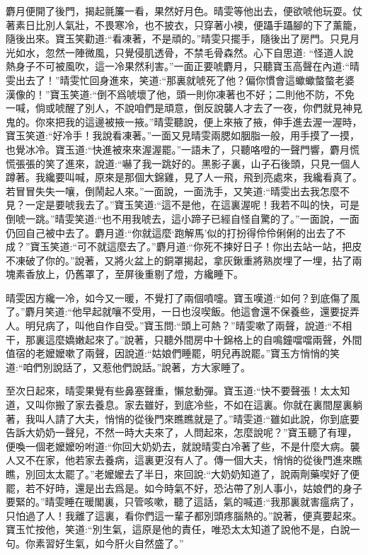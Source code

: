 \begin{parag}
    麝月便開了後門，揭起氈簾一看，果然好月色。晴雯等他出去，便欲唬他玩耍。仗著素日比別人氣壯，不畏寒冷，也不披衣，只穿著小襖，便躡手躡腳的下了薰籠，隨後出來。寶玉笑勸道:“看凍著，不是頑的。”晴雯只擺手，隨後出了房門。只見月光如水，忽然一陣微風，只覺侵肌透骨，不禁毛骨森然。心下自思道: “怪道人說熱身子不可被風吹，這一冷果然利害。”一面正要唬麝月，只聽寶玉高聲在內道:“晴雯出去了！”晴雯忙回身進來，笑道:“那裏就唬死了他？偏你慣會這蠍蠍螫螫老婆漢像的！”寶玉笑道:“倒不爲唬壞了他，頭一則你凍著也不好；二則他不防，不免一喊，倘或唬醒了別人，不說咱們是頑意，倒反說襲人才去了一夜，你們就見神見鬼的。你來把我的這邊被掖一掖。”晴雯聽說，便上來掖了掖，伸手進去渥一渥時，寶玉笑道:“好冷手！我說看凍著。”一面又見晴雯兩腮如胭脂一般，用手摸了一摸，也覺冰冷。寶玉道:“快進被來來渥渥罷。”一語未了，只聽咯噔的一聲門響，麝月慌慌張張的笑了進來，說道:“嚇了我一跳好的。黑影子裏，山子石後頭，只見一個人蹲著。我纔要叫喊，原來是那個大錦雞，見了人一飛，飛到亮處來，我纔看真了。若冒冒失失一嚷，倒鬧起人來。”一面說，一面洗手，又笑道:“晴雯出去我怎麼不見？一定是要唬我去了。”寶玉笑道:“這不是他，在這裏渥呢！我若不叫的快，可是倒唬一跳。”晴雯笑道:“也不用我唬去，這小蹄子已經自怪自驚的了。”一面說，一面仍回自己被中去了。麝月道:“你就這麼‘跑解馬’似的打扮得伶伶俐俐的出去了不成？”寶玉笑道:“可不就這麼去了。”麝月道:“你死不揀好日子！你出去站一站，把皮不凍破了你的。”說著，又將火盆上的銅罩揭起，拿灰鍬重將熟炭埋了一埋，拈了兩塊素香放上，仍舊罩了，至屏後重剔了燈，方纔睡下。
\end{parag}


\begin{parag}
    晴雯因方纔一冷，如今又一暖，不覺打了兩個噴嚏。寶玉嘆道:“如何？到底傷了風了。”麝月笑道:“他早起就嚷不受用，一日也沒喫飯。他這會還不保養些，還要捉弄人。明兒病了，叫他自作自受。”寶玉問:“頭上可熱？”晴雯嗽了兩聲，說道:“不相干，那裏這麼嬌嫩起來了。”說著，只聽外間房中十錦格上的自鳴鐘噹噹兩聲，外間值宿的老嬤嬤嗽了兩聲，因說道:“姑娘們睡罷，明兒再說罷。”寶玉方悄悄的笑道:“咱們別說話了，又惹他們說話。”說著，方大家睡了。
\end{parag}


\begin{parag}
    至次日起來，晴雯果覺有些鼻塞聲重，懶怠動彈。寶玉道:“快不要聲張！太太知道，又叫你搬了家去養息。家去雖好，到底冷些，不如在這裏。你就在裏間屋裏躺著，我叫人請了大夫，悄悄的從後門來瞧瞧就是了。”晴雯道:“雖如此說，你到底要告訴大奶奶一聲兒，不然一時大夫來了，人問起來，怎麼說呢？”寶玉聽了有理，便喚一個老嬤嬤吩咐道:“你回大奶奶去，就說晴雯白冷著了些，不是什麼大病。襲人又不在家，他若家去養病，這裏更沒有人了。傳一個大夫，悄悄的從後門進來瞧瞧，別回太太罷了。”老嬤嬤去了半日，來回說:“大奶奶知道了，說兩劑藥喫好了便罷，若不好時，還是出去爲是。如今時氣不好，恐沾帶了別人事小，姑娘們的身子要緊的。”晴雯睡在暖閣裏，只管咳嗽，聽了這話，氣的喊道:“我那裏就害瘟病了，只怕過了人！我離了這裏，看你們這一輩子都別頭疼腦熱的。”說著，便真要起來。寶玉忙按他，笑道:“別生氣，這原是他的責任，唯恐太太知道了說他不是，白說一句。你素習好生氣，如今肝火自然盛了。”
\end{parag}


